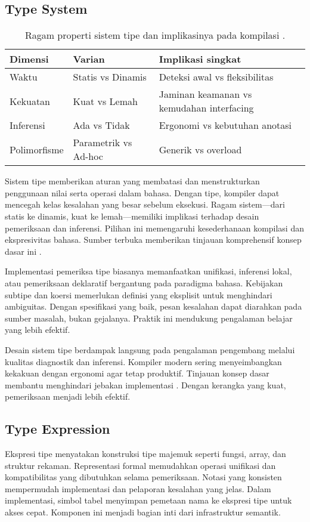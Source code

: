 \documentclass[../main.tex]{subfiles}
\begin{document}
\subsection{Type System}
\begin{table}[t]
  \centering
  \caption{Ragam properti sistem tipe dan implikasinya pada kompilasi \citep{WikiTypeSystem}.}
  \label{tab:type-system}
  \begin{tabular}{@{}lll@{}}
    \toprule
    Dimensi & Varian & Implikasi singkat \\
    \midrule
    Waktu & Statis vs Dinamis & Deteksi awal vs fleksibilitas \\
    Kekuatan & Kuat vs Lemah & Jaminan keamanan vs kemudahan interfacing \\
    Inferensi & Ada vs Tidak & Ergonomi vs kebutuhan anotasi \\
    Polimorfisme & Parametrik vs Ad-hoc & Generik vs overload \\
    \bottomrule
  \end{tabular}
\end{table}
Sistem tipe memberikan aturan yang membatasi dan menstrukturkan penggunaan nilai serta operasi dalam bahasa. Dengan tipe, kompiler dapat mencegah kelas kesalahan yang besar sebelum eksekusi. Ragam sistem—dari statis ke dinamis, kuat ke lemah—memiliki implikasi terhadap desain pemeriksaan dan inferensi. Pilihan ini memengaruhi kesederhanaan kompilasi dan ekspresivitas bahasa. Sumber terbuka memberikan tinjauan komprehensif konsep dasar ini \citep{WikiTypeSystem}.

Implementasi pemeriksa tipe biasanya memanfaatkan unifikasi, inferensi lokal, atau pemeriksaan deklaratif bergantung pada paradigma bahasa. Kebijakan subtipe dan koersi memerlukan definisi yang eksplisit untuk menghindari ambiguitas. Dengan spesifikasi yang baik, pesan kesalahan dapat diarahkan pada sumber masalah, bukan gejalanya. Praktik ini mendukung pengalaman belajar yang lebih efektif.

Desain sistem tipe berdampak langsung pada pengalaman pengembang melalui kualitas diagnostik dan inferensi. Kompiler modern sering menyeimbangkan kekakuan dengan ergonomi agar tetap produktif. Tinjauan konsep dasar membantu menghindari jebakan implementasi \citep{WikiTypeSystem}. Dengan kerangka yang kuat, pemeriksaan menjadi lebih efektif.

\subsection{Type Expression}
Ekspresi tipe menyatakan konstruksi tipe majemuk seperti fungsi, array, dan struktur rekaman. Representasi formal memudahkan operasi unifikasi dan kompatibilitas yang dibutuhkan selama pemeriksaan. Notasi yang konsisten mempermudah implementasi dan pelaporan kesalahan yang jelas. Dalam implementasi, simbol tabel menyimpan pemetaan nama ke ekspresi tipe untuk akses cepat. Komponen ini menjadi bagian inti dari infrastruktur semantik.
\end{document}
